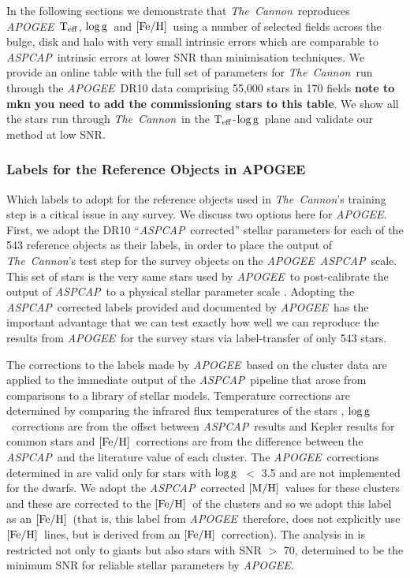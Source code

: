 \documentclass[12pt, preprint]{aastex}
\newcommand{\teff}{\mbox{$\rm T_{eff}$}}
\newcommand{\feh}{\mbox{$\rm [Fe/H]$}}
\newcommand{\mh}{\mbox{$\rm [M/H]$}}
\newcommand{\logg}{\mbox{$\rm \log g$}}
\newcommand{\tc}{\textsl{The~Cannon}}
\newcommand{\apogee}{\textsl{APOGEE}}
\newcommand{\aspcap}{\textsl{ASPCAP}}
\begin{document}

In the following sections we demonstrate that \tc\ reproduces \apogee\ \teff, \logg\ and \feh\ using a number of selected fields across the bulge, disk and halo with very small intrinsic errors which are comparable to \aspcap\ intrinsic errors at lower SNR than minimisation techniques. 
We provide an online table with the full set of parameters for \tc\ run through the \apogee\ DR10 data comprising 55,000 stars in 170 fields \textbf{note to mkn you need to add the commissioning stars to this table}.  
We show all the stars run through \tc\ in the \teff-\logg\ plane and validate our method at low SNR.

\subsubsection{Labels for the Reference Objects in APOGEE}
\label{sec:ApogeeRefLabels}

Which labels to adopt for the reference objects used in \tc 's training step is a citical issue
in any survey. We discuss two options here for \apogee . 
First, we adopt the DR10 ``\aspcap\ corrected'' stellar parameters for each of the 543 reference objects as their labels, in order to place the output of \tc 's test step for the survey objects on the \apogee\ \aspcap\ scale.
 This set of stars is the very same stars used by \apogee\ to post-calibrate the output of \aspcap\ to a physical stellar parameter scale \citep{Meszaros2013}.
Adopting the \aspcap\ corrected labels provided and documented by \apogee\ has the important advantage 
that we can test exactly how well we can reproduce the results from \apogee\ for the survey stars via label-transfer of only 543 stars.

The corrections to the labels made by \apogee\ based on the cluster data are applied to the immediate output of the \aspcap\ pipeline that arose from comparisons to a library of stellar models.
Temperature corrections are determined by comparing the infrared flux temperatures of the stars \citep{gonzalez2009}, \logg\ corrections are from the offset between \aspcap\ results and Kepler results for common stars and \feh\ corrections are from the difference between the \aspcap\ and  the literature value of each cluster.  
The \apogee\ corrections determined in \citet{Meszaros2013} are valid only for stars with \logg\ $<$ 3.5 and are not implemented for the dwarfs.  We adopt the \aspcap\ corrected \mh\ values for these clusters and these are corrected to the \feh\ of the clusters and so we adopt this label as an \feh\ (that is, this label from \apogee\ therefore, does not explicitly use \feh\ lines, but is derived from an \feh\ correction). 
The analysis in \citet{Meszaros2013} is restricted not only to giants but also stars with SNR $>$ 70, determined to be the minimum SNR for reliable stellar parameters by \apogee.
\end{document}
